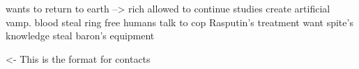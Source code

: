 \documentclass[char]{guildcamp4}
\begin{document}
\name{\cJames{}}

wants to return to earth --> rich
allowed to continue studies
create artificial vamp. blood
steal ring
free humans
talk to cop
Rasputin's treatment
want spite's knowledge
steal baron's equipment

\begin{itemz}[Goals]
	\item 
\end{itemz}

\begin{itemz}[Notes]
	\item 
\end{itemz}

\begin{contacts}
	\contact{\cTest{}} <- This is the format for contacts 
\end{contacts}
\end{document}
